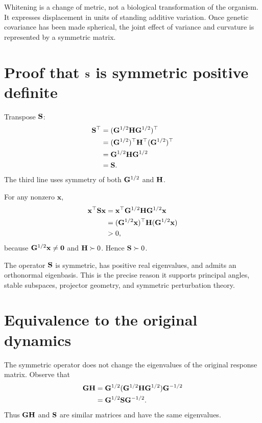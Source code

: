 \begin{mathteach}
Whitening is a change of metric, not a biological transformation of the organism. It expresses displacement in units of standing additive variation. Once genetic covariance has been made spherical, the joint effect of variance and curvature is represented by a symmetric matrix.
\end{mathteach}

\section{Proof that \(\mathbf{S}\) is symmetric positive definite}

Transpose \(\mathbf{S}\):
\begin{align}
\mathbf{S}^\top
&=(\mathbf{G}^{1/2}\mathbf{H}\mathbf{G}^{1/2})^\top\\
&=(\mathbf{G}^{1/2})^\top\mathbf{H}^\top(\mathbf{G}^{1/2})^\top\\
&=\mathbf{G}^{1/2}\mathbf{H}\mathbf{G}^{1/2}\\
&=\mathbf{S}.
\end{align}
The third line uses symmetry of both \(\mathbf{G}^{1/2}\) and \(\mathbf{H}\).

For any nonzero \(\mathbf x\),
\begin{align}
\mathbf x^\top\mathbf{S}\mathbf x
&=\mathbf x^\top\mathbf{G}^{1/2}\mathbf{H}\mathbf{G}^{1/2}\mathbf x\\
&=(\mathbf{G}^{1/2}\mathbf x)^\top\mathbf{H}(\mathbf{G}^{1/2}\mathbf x)\\
&>0,
\end{align}
because \(\mathbf{G}^{1/2}\mathbf x\neq\mathbf{0}\) and \(\mathbf{H}\succ0\). Hence \(\mathbf{S}\succ0\).

\begin{summarybox}
The operator \(\mathbf{S}\) is symmetric, has positive real eigenvalues, and admits an orthonormal eigenbasis. This is the precise reason it supports principal angles, stable subspaces, projector geometry, and symmetric perturbation theory.
\end{summarybox}

\section{Equivalence to the original dynamics}

The symmetric operator does not change the eigenvalues of the original response matrix. Observe that
\begin{align}
\mathbf{G}\mathbf{H}
&=\mathbf{G}^{1/2}(\mathbf{G}^{1/2}\mathbf{H}\mathbf{G}^{1/2})\mathbf{G}^{-1/2}\\
&=\mathbf{G}^{1/2}\mathbf{S}\mathbf{G}^{-1/2}.
\label{eq:similarityGH}
\end{align}
Thus \(\mathbf{G}\mathbf{H}\) and \(\mathbf{S}\) are similar matrices and have the same eigenvalues.

